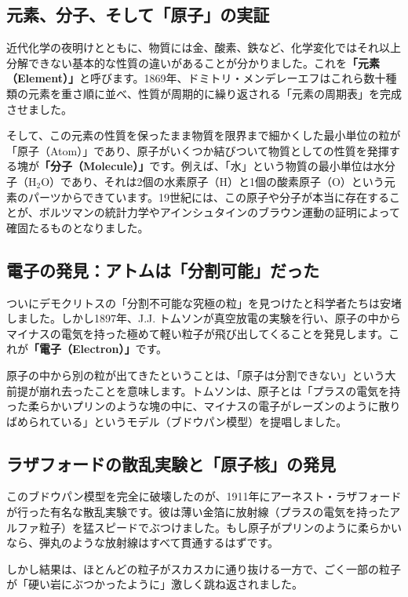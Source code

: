 \subsection{元素、分子、そして「原子」の実証}

近代化学の夜明けとともに、物質には金、酸素、鉄など、化学変化ではそれ以上分解できない基本的な性質の違いがあることが分かりました。これを\textbf{「元素（Element）」}と呼びます。1869年、ドミトリ・メンデレーエフはこれら数十種類の元素を重さ順に並べ、性質が周期的に繰り返される「元素の周期表」を完成させました。

そして、この元素の性質を保ったまま物質を限界まで細かくした最小単位の粒が「原子（Atom）」であり、原子がいくつか結びついて物質としての性質を発揮する塊が\textbf{「分子（Molecule）」}です。例えば、「水」という物質の最小単位は水分子（H\(_2\)O）であり、それは2個の水素原子（H）と1個の酸素原子（O）という元素のパーツからできています。19世紀には、この原子や分子が本当に存在することが、ボルツマンの統計力学やアインシュタインのブラウン運動の証明によって確固たるものとなりました。

\subsection{電子の発見：アトムは「分割可能」だった}

ついにデモクリトスの「分割不可能な究極の粒」を見つけたと科学者たちは安堵しました。しかし1897年、J.J. トムソンが真空放電の実験を行い、原子の中からマイナスの電気を持った極めて軽い粒子が飛び出してくることを発見します。これが\textbf{「電子（Electron）」}です。

原子の中から別の粒が出てきたということは、「原子は分割できない」という大前提が崩れ去ったことを意味します。トムソンは、原子とは「プラスの電気を持った柔らかいプリンのような塊の中に、マイナスの電子がレーズンのように散りばめられている」というモデル（ブドウパン模型）を提唱しました。

\subsection{ラザフォードの散乱実験と「原子核」の発見}

このブドウパン模型を完全に破壊したのが、1911年にアーネスト・ラザフォードが行った有名な散乱実験です。彼は薄い金箔に放射線（プラスの電気を持ったアルファ粒子）を猛スピードでぶつけました。もし原子がプリンのように柔らかいなら、弾丸のような放射線はすべて貫通するはずです。

しかし結果は、ほとんどの粒子がスカスカに通り抜ける一方で、ごく一部の粒子が「硬い岩にぶつかったように」激しく跳ね返されました。

